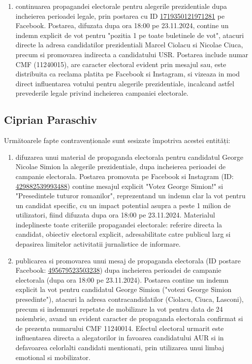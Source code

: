 \documentclass[a4paper,12pt]{article}
\begin{document}
\begin{enumerate}[leftmargin=*, label=\arabic*.)]
    \item continuarea propagandei electorale pentru alegerile prezidentiale dupa incheierea perioadei legale, prin postarea cu ID \href{https://www.facebook.com/ads/library/?id=1719350121971281}{1719350121971281} pe Facebook. Postarea, difuzata dupa ora 18:00 pe 23.11.2024, contine un indemn explicit de vot pentru "pozitia 1 pe toate buletinele de vot", atacuri directe la adresa candidatilor prezidentiali Marcel Ciolacu si Nicolae Ciuca, precum si promovarea indirecta a candidatului USR. Postarea include numar CMF (11240015), are caracter electoral evident prin mesajul sau, este distribuita ca reclama platita pe Facebook si Instagram, si vizeaza in mod direct influentarea votului pentru alegerile prezidentiale, incalcand astfel prevederile legale privind incheierea campaniei electorale.
\end{enumerate}

\vspace{0.5cm}

\subsection{Ciprian Paraschiv}
Următoarele fapte contravenționale sunt sesizate împotriva acestei entități:

\begin{enumerate}[leftmargin=*, label=\arabic*.)]
    \item difuzarea unui material de propaganda electorala pentru candidatul George Nicolae Simion la alegerile prezidentiale, dupa incheierea perioadei de campanie electorala. Postarea promovata pe Facebook si Instagram (ID: \href{https://www.facebook.com/ads/library/?id=429882539993488}{429882539993488}) contine mesajul explicit "Votez George Simion!" si "Presedintele tuturor romanilor", reprezentand un indemn clar la vot pentru un candidat specific, cu un impact potential asupra a peste 1 milion de utilizatori, fiind difuzata dupa ora 18:00 pe 23.11.2024. Materialul indeplineste toate criteriile propagandei electorale: referire directa la candidat, obiectiv electoral explicit, adresabilitate catre publicul larg si depasirea limitelor activitatii jurnalistice de informare.
    \item publicarea si promovarea unui mesaj de propaganda electorala (ID postare Facebook: \href{https://www.facebook.com/ads/library/?id=495679523503238}{495679523503238}) dupa incheierea perioadei de campanie electorala (dupa ora 18:00 pe 23.11.2024). Postarea contine un indemn explicit la vot pentru candidatul George Simion ("votezi George Simion presedinte"), atacuri la adresa contracandidatilor (Ciolacu, Ciuca, Lasconi), precum si indemnuri repetate de mobilizare la vot pentru data de 24 noiembrie, avand un evident caracter de propaganda electorala confirmat si de prezenta numarului CMF 11240014. Efectul electoral urmarit este influentarea directa a alegatorilor in favoarea candidatului AUR si in defavoarea celorlalti candidati mentionati, prin utilizarea unui limbaj emotional si mobilizator.
\end{enumerate}
\end{document}
